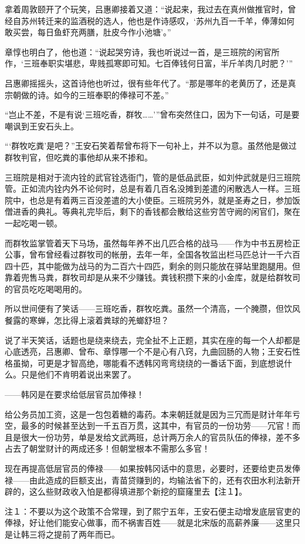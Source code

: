 拿着周敦颐开了个玩笑，吕惠卿接着又道：“说起来，我过去在真州做推官时，曾经自苏州转迁来的监酒税的选人，他也是作诗感叹，‘苏州九百一千羊，俸薄如何敢买尝，每日鱼虾充两膳，肚皮今作小池塘’。”

章惇也明白了，他也道：“说起哭穷诗，我也听说过一首，是三班院的闲官所作，‘三班奉职实堪悲，卑贱孤寒即可知。七百俸钱何日富，半斤羊肉几时肥？’”

吕惠卿摇摇头，这首诗他也听过，很有些年代了。“那是哪年的老黄历了，还是真宗朝做的诗。如今的三班奉职的俸禄可不差。”

“岂止不差，不是有说‘三班吃香，群牧……’”曾布突然住口，因为下一句话，可是要嘲讽到王安石头上。

“‘群牧吃粪’是吧？”王安石笑着帮曾布将下一句补上，并不以为意。虽然他是做过群牧判官，但吃粪的事他却从来不掺和。

三班院是相对于流内铨的武官铨选衙门，管的是低品武臣，如刘仲武就是归三班院管。正如流内铨内外不论何时，总是有着几百名没摊到差遣的闲散选人一样。三班院中，也总是有着两三百没差遣的大小使臣。三班院另外，就是圣寿之日，参加饭僧进香的典礼。等典礼完毕后，剩下的香钱都会散给这些穷苦守阙的闲官们，聚在一起吃喝一顿。

而群牧监掌管着天下马场，虽然每年养不出几匹合格的战马——作为中书五房检正公事，曾布曾经看过群牧司的帐册，去年一年，全国各牧监出栏马匹总计一千六百四十匹，其中能做为战马的为二百六十四匹，剩余的则只能放在驿站里跑腿用。但靠着兜售马粪，群牧司却是从来不少赚钱。粪钱积攒下来的小金库，就是给群牧司的官员吃吃喝喝用的。

所以世间便有了笑话——三班吃香，群牧吃粪。虽然一个清高，一个腌臜，但饮风餐露的寒蝉，怎比得上滚着粪球的羌螂舒坦？

说了半天笑话，话题也是绕来绕去，完全扯不上正题，其实在座的每一个人却都是心底透亮，吕惠卿、曾布、章惇哪一个不是心有八窍，九曲回肠的人物；王安石性格虽拗，可更是才智高绝，哪能看不透韩冈弯弯绕绕的一番话下面，到底想说什么。只是他们不肯明着说出来罢了。

——韩冈是在要求给低层官员加俸禄！

给公务员加工资，这是一包包着糖的毒药。本来朝廷就是因为三冗而是财计年年亏空，最多的时候甚至达到一千五百万贯，这其中，有官员的一份功劳——冗官！而且是很大一份功劳，单是发给文武两班，总计两万余人的官员队伍的俸禄，差不多占去了朝堂财计的两成还多！但朝堂根本不需那么多官！

现在再提高低层官员的俸禄——如果按韩冈话中的意思，必要时，还要给吏员发俸禄——由此造成的巨额支出，青苗贷赚到的，均输法省下的，还有农田水利法新开辟的，这么些财政收入怕是都得填进那个新挖的窟窿里去【注１】。

注１：不要以为这个政策不合常理，到了熙宁五年，王安石便主动增发底层官吏的俸禄，好让他们能安心做事，而不祸害百姓——就是北宋版的高薪养廉——这里只是让韩三将之提前了两年而已。

